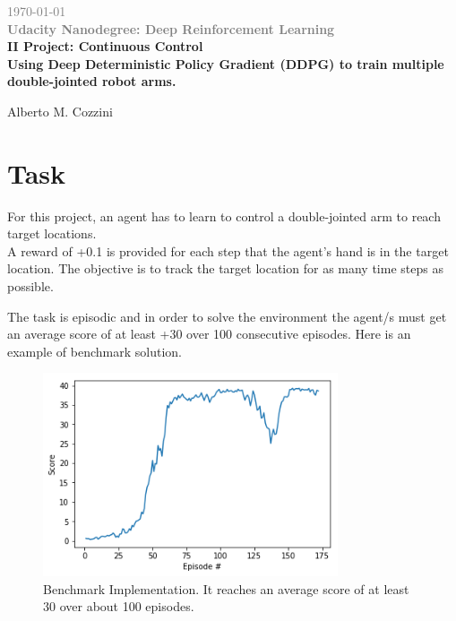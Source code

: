 \documentclass[pagenumber=off]{article}
\begin{document}
\begin{titlepage}
\begin{center}
\vspace{1cm}
{\textcolor{gray}\today}\\
{\textcolor{gray}{\bf Udacity Nanodegree: Deep Reinforcement Learning }}\\
\vspace{1.5cm}
{\textcolor{coolblack}{\huge \bf II Project: Continuous Control}}\\
\vspace{0.5cm}
{\textcolor{coolblack}{\Large \bf  Using Deep Deterministic Policy Gradient (DDPG) to train multiple double-jointed robot arms.}}
\par
\vspace{0.5cm}
\vspace{6cm}
\end{center}
\tableofcontents

\vspace{4cm}

\begin{center}
{Alberto M. Cozzini}\\
\end{center}
\end{titlepage}

\section{Task}
For this project, an agent has to learn to control a double-jointed arm to reach target locations.\\
A reward of +0.1 is provided for each step that the agent's hand is in the target location. The objective is to track the target location for as many time steps as possible.

The task is episodic and in order to solve the environment the agent/s must get an average score of at least +30 over 100 consecutive episodes. Here is an example of benchmark solution.
\begin{figure}[!h]
  \centerline{\includegraphics[page=1, height=6cm, width=12 cm, angle=0]{./Plots/Benchmark_Score.png}}
  \caption{Benchmark Implementation. It reaches an average score of at least 30 over about 100 episodes.}
\end{figure}
\end{document}
